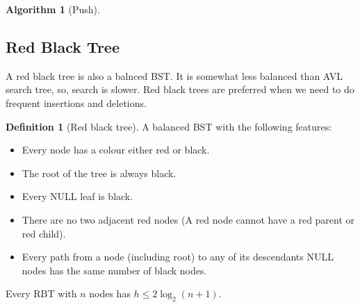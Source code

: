 \documentclass[10pt, a4paper]{extarticle}
\theoremstyle{definition}
\newtheorem{alg}{Algorithm}
\newtheorem{defn}{Definition}
\begin{document}
\begin{alg}[Push]
	\subsection{Red Black Tree}
	A red black tree is also a balnced BST. It is somewhat less balanced than AVL search tree, so, search is slower. Red black trees are preferred when we need to do frequent insertions and deletions.
	\begin{defn}[Red black tree]
		A balanced BST with the following features:
		\begin{itemize}
			\item Every node has a colour either red or black.
			\item The root of the tree is always black.
			\item Every NULL leaf is black.
			\item There are no two adjacent red nodes (A red node cannot have a red parent or red child).
			\item Every path from a node (including root) to any of its descendants NULL nodes has the same number of black nodes.
		\end{itemize}
		Every RBT with $n$ nodes has $h\leq 2\log_2(n+1)$.
	\end{defn}


\end{alg}
\end{document}
